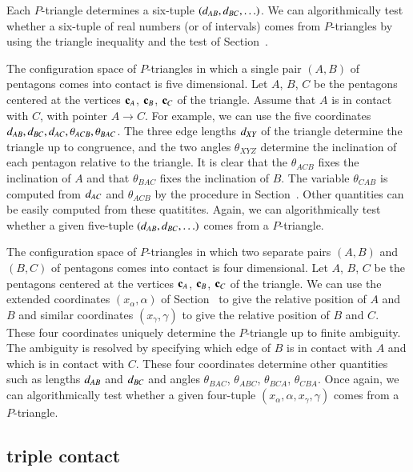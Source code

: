 Each $P$-triangle determines a six-tuple $(d_{AB},d_{BC},\ldots)$.
We can algorithmically test whether a six-tuple of real numbers
(or of intervals)  comes from $P$-triangles by using the triangle
inequality and the test of Section~.

The configuration space of $P$-triangles in which a single pair
$(A,B)$ of pentagons comes into contact is five dimensional.  Let $A$,
$B$, $C$ be the pentagons centered at the vertices ${\mathbf c}_A$, ${\mathbf c}_B$,
${\mathbf c}_C$ of the triangle.  Assume that $A$ is in contact with $C$, with
pointer $A\to C$.  For example, we can use the five coordinates
$d_{AB},d_{BC},d_{AC},\theta_{ACB},\theta_{BAC}$.  The three edge
lengths $d_{XY}$ of the triangle determine the triangle up to
congruence, and the two angles $\theta_{XYZ}$ determine the
inclination of each pentagon relative to the triangle.  It is clear
that the $\theta_{ACB}$ fixes the inclination of $A$ and that
$\theta_{BAC}$ fixes the inclination of $B$.  The variable
$\theta_{CAB}$ is computed from $d_{AC}$ and $\theta_{ACB}$ by the
procedure in Section~.  Other quantities can be easily
computed from these quatitites. Again, we can algorithmically
test whether a given five-tuple $(d_{AB},d_{BC},\ldots)$ 
comes from a $P$-triangle.


The configuration space of $P$-triangles in which two separate pairs
$(A,B)$ and $(B,C)$ of pentagons comes into contact is four
dimensional.  Let $A$, $B$, $C$ be the pentagons centered at the
vertices ${\mathbf c}_A$, ${\mathbf c}_B$, ${\mathbf c}_C$ of the triangle.  We can use the
extended coordinates $(x_\alpha,\alpha)$ of Section~
to give the relative position of $A$ and $B$ and similar coordinates
$(x_\gamma,\gamma)$ to give the relative position of $B$ and $C$.
These four coordinates uniquely determine the $P$-triangle up to
finite ambiguity.  The ambiguity is resolved by specifying which edge
of $B$ is in contact with $A$ and which is in contact with $C$.  These
four coordinates determine other quantities such as lengths $d_{AB}$
and $d_{BC}$ and angles $\theta_{BAC}$, $\theta_{ABC}$,
$\theta_{BCA}$, $\theta_{CBA}$.  Once again, we can algorithmically
test whether a given four-tuple $(x_\alpha,\alpha,x_\gamma,\gamma)$
comes from a $P$-triangle.


\subsection{triple contact}

